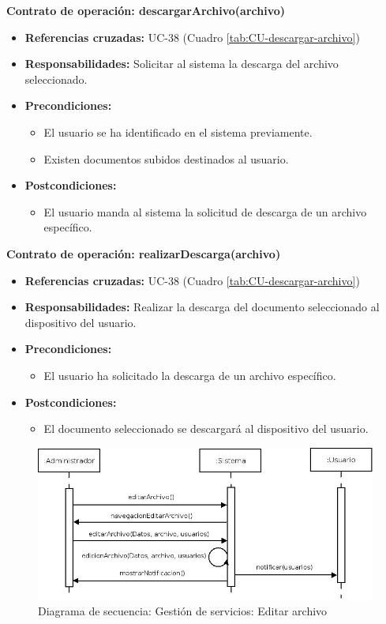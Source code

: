 \textbf{Contrato de operación: descargarArchivo(archivo)}
\begin{itemize}
\item \textbf{Referencias cruzadas:} UC-38 (Cuadro \ref{tab:CU-descargar-archivo})
\item \textbf{Responsabilidades:} Solicitar al sistema la descarga del archivo seleccionado.
\item \textbf{Precondiciones:} 
 \begin{itemize}
\item El usuario se ha identificado en el sistema previamente.
\item Existen documentos subidos destinados al usuario.
\end {itemize}
\item \textbf{Postcondiciones:} 
 \begin{itemize}
\item El usuario manda al sistema la solicitud de descarga de un archivo específico.
\end {itemize}
\end {itemize}

\textbf{Contrato de operación: realizarDescarga(archivo)}
\begin{itemize}
\item \textbf{Referencias cruzadas:} UC-38 (Cuadro \ref{tab:CU-descargar-archivo})
\item \textbf{Responsabilidades:} Realizar la descarga del documento seleccionado al dispositivo del usuario.
\item \textbf{Precondiciones:} 
 \begin{itemize}
\item El usuario ha solicitado la descarga de un archivo específico.
\end {itemize}
\item \textbf{Postcondiciones:} 
 \begin{itemize}
\item El documento seleccionado se descargará al dispositivo del usuario.
\end {itemize}
\end {itemize}


\vspace{7mm}
\dotfill
\vspace{7mm}

\begin{figure}[h!]
\centering
  \includegraphics[scale=.50]{img/secuencias/gestion-servicios-editar-archivo.jpeg}
  \caption{Diagrama de secuencia: Gestión de servicios: Editar archivo}
  \label{fig:secuencia-gestion-servicios-editar-archivo}
\end{figure}

